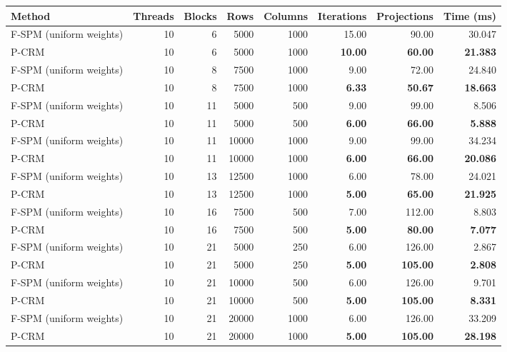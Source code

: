 \begin{tabular}{lrrrrrrr}
\toprule
Method & Threads & Blocks & Rows & Columns & Iterations & Projections & Time (ms) \\
\midrule
F-SPM (uniform weights) & 10 & 6 & 5000 & 1000 & 15.00 & 90.00 & 30.047 \\
P-CRM & 10 & 6 & 5000 & 1000 & \textbf{10.00} & \textbf{60.00} & \textbf{21.383} \\
\midrule
F-SPM (uniform weights) & 10 & 8 & 7500 & 1000 & 9.00 & 72.00 & 24.840 \\
P-CRM & 10 & 8 & 7500 & 1000 & \textbf{6.33} & \textbf{50.67} & \textbf{18.663} \\
\midrule
F-SPM (uniform weights) & 10 & 11 & 5000 & 500 & 9.00 & 99.00 & 8.506 \\
P-CRM & 10 & 11 & 5000 & 500 & \textbf{6.00} & \textbf{66.00} & \textbf{5.888} \\
\midrule
F-SPM (uniform weights) & 10 & 11 & 10000 & 1000 & 9.00 & 99.00 & 34.234 \\
P-CRM & 10 & 11 & 10000 & 1000 & \textbf{6.00} & \textbf{66.00} & \textbf{20.086} \\
\midrule
F-SPM (uniform weights) & 10 & 13 & 12500 & 1000 & 6.00 & 78.00 & 24.021 \\
P-CRM & 10 & 13 & 12500 & 1000 & \textbf{5.00} & \textbf{65.00} & \textbf{21.925} \\
\midrule
F-SPM (uniform weights) & 10 & 16 & 7500 & 500 & 7.00 & 112.00 & 8.803 \\
P-CRM & 10 & 16 & 7500 & 500 & \textbf{5.00} & \textbf{80.00} & \textbf{7.077} \\
\midrule
F-SPM (uniform weights) & 10 & 21 & 5000 & 250 & 6.00 & 126.00 & 2.867 \\
P-CRM & 10 & 21 & 5000 & 250 & \textbf{5.00} & \textbf{105.00} & \textbf{2.808} \\
\midrule
F-SPM (uniform weights) & 10 & 21 & 10000 & 500 & 6.00 & 126.00 & 9.701 \\
P-CRM & 10 & 21 & 10000 & 500 & \textbf{5.00} & \textbf{105.00} & \textbf{8.331} \\
\midrule
F-SPM (uniform weights) & 10 & 21 & 20000 & 1000 & 6.00 & 126.00 & 33.209 \\
P-CRM & 10 & 21 & 20000 & 1000 & \textbf{5.00} & \textbf{105.00} & \textbf{28.198} \\

\end{tabular}
